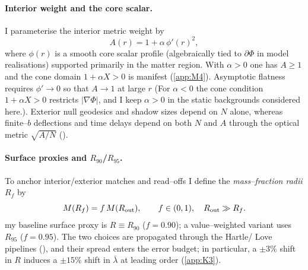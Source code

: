 \documentclass{iopjournal}
\begin{document}
\paragraph{Interior weight and the core scalar.}
I parameterise the interior metric weight by
\begin{equation}
A(r)=1+\alpha\,\phi'(r)^{2},
\label{eq:7_A_def}
\end{equation}
where $\phi(r)$ is a smooth core scalar profile (algebraically tied to $\partial\Phi$ in model realisations) supported primarily in the matter region. With $\alpha>0$ one has $A\ge1$ and the cone domain $1+\alpha X>0$ is manifest (\cref{app:M4}). Asymptotic flatness requires $\phi'\to0$ so that $A\to1$ at large $r$ (For $\alpha<0$ the cone condition $1+\alpha X>0$ restricts $|\nabla\Phi|$, and I keep $\alpha>0$ in the static backgrounds considered here.). Exterior null geodesics and shadow sizes depend on $N$ alone, whereas finite–$b$ deflections and time delays depend on both $N$ and $A$ through the optical metric $\sqrt{A/N}$ ().



\paragraph{Surface proxies and $R_{90}$/$R_{95}$.}
To anchor interior/exterior matches and read–offs I define the \emph{mass–fraction radii} $R_f$ by
\begin{equation}
M(R_f)=f\,M(R_{\rm out}),\qquad f\in(0,1),\quad R_{\rm out}\gg R_f.
\label{eq:7_Rf}
\end{equation}
my baseline surface proxy is $R\equiv R_{90}$ ($f=0.90$); a value–weighted variant uses $R_{95}$ ($f=0.95$). The two choices are propagated through the Hartle/ Love pipelines (), and their spread enters the error budget; in particular, a $\pm3\%$ shift in $R$ induces a $\pm15\%$ shift in $\bar\lambda$ at leading order (\cref{app:K3}).
\end{document}
